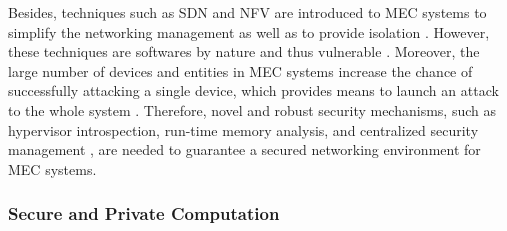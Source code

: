 \documentclass[journal]{IEEEtran}
\begin{document}
{Besides, techniques such as SDN and NFV are introduced to MEC systems to simplify the networking management as well as to provide isolation \cite{ETSI14}. However, these techniques are softwares by nature and thus vulnerable \cite{Liyanage1607,WYang1606}. Moreover, the large number of devices and entities in MEC systems increase the chance of successfully attacking a single device, which provides means to launch an attack to the whole system \cite{BLiang17}. Therefore, novel and robust security mechanisms, such as hypervisor introspection, run-time memory analysis, and centralized security management \cite{AlcatelNFVsecurity}, are needed to guarantee a secured networking environment for MEC systems.

\subsubsection{\textbf{Secure and Private Computation}}

}
\end{document}
